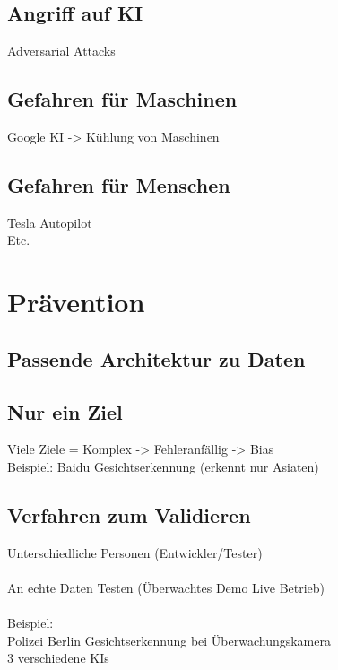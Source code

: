 \documentclass[12pt,oneside,a4paper,parskip]{scrbook}
\begin{document}
\section{Angriff auf KI}
Adversarial Attacks
\section{Gefahren für Maschinen}
Google KI -> Kühlung von Maschinen
\section{Gefahren für Menschen}
Tesla Autopilot
\\Etc.

\chapter{Prävention }
\label{chapter:main}
\section{Passende Architektur zu Daten}

\section{Nur ein Ziel}
Viele Ziele = Komplex -> Fehleranfällig -> Bias
\\Beispiel: Baidu Gesichtserkennung (erkennt nur Asiaten)

\section{Verfahren zum Validieren}
Unterschiedliche Personen (Entwickler/Tester)
\\\\An echte Daten Testen (Überwachtes Demo Live Betrieb)
\\\\Beispiel:
\\Polizei Berlin Gesichtserkennung bei Überwachungskamera
\\3 verschiedene KIs
\end{document}
